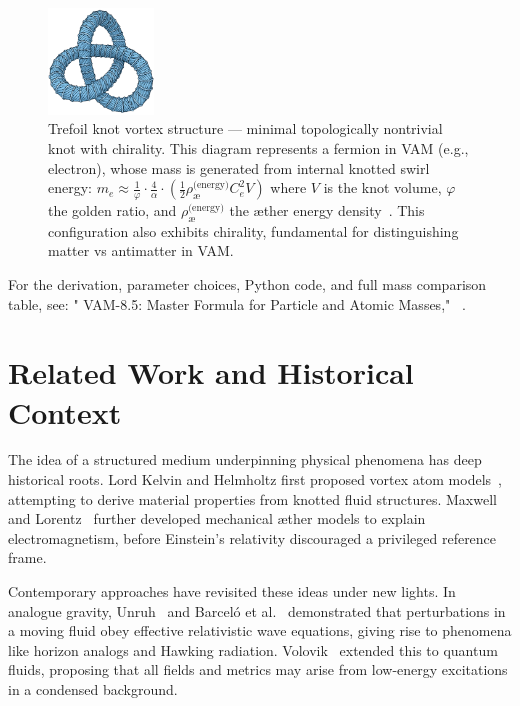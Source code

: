 \begin{figure}[H]
    \centering
    \includegraphics[width=0.25\textwidth]{figures/Tre-foil}
    \caption{Trefoil knot vortex structure — minimal topologically nontrivial knot with chirality. This diagram represents a fermion in VAM (e.g., electron), whose mass is generated from internal knotted swirl energy:
        \(
            m_e \approx \frac{1}{\varphi} \cdot \frac{4}{\alpha} \cdot \left( \frac{1}{2} \rho_{\text{\ae}}^{\text{(energy)}} C_e^2 V \right)
        \)
        where $V$ is the knot volume, $\varphi$ the golden ratio, and $\rho_{\text{\ae}}^{\text{(energy)}}$ the æther energy density~\cite{iskandarani2025a, iskandarani2025b}. This configuration also exhibits chirality, fundamental for distinguishing matter vs antimatter in VAM.}
    \label{fig:trefoil-vortex}
\end{figure}

For the derivation, parameter choices, Python code, and full mass comparison table, see: "  VAM-8.5: Master Formula for Particle and Atomic Masses," ~\cite{VAM-8, VAM-8.5}.

\section{Related Work and Historical Context}

    The idea of a structured medium underpinning physical phenomena has deep historical roots. Lord Kelvin and Helmholtz first proposed vortex atom models~\cite{thomson1867}, attempting to derive material properties from knotted fluid structures. Maxwell~\cite{maxwell1861} and Lorentz~\cite{lorentz1904} further developed mechanical æther models to explain electromagnetism, before Einstein's relativity discouraged a privileged reference frame.

    Contemporary approaches have revisited these ideas under new lights. In analogue gravity, Unruh~\cite{unruh1981} and Barceló et al.~\cite{barcelo2011} demonstrated that perturbations in a moving fluid obey effective relativistic wave equations, giving rise to phenomena like horizon analogs and Hawking radiation. Volovik~\cite{volovik2003} extended this to quantum fluids, proposing that all fields and metrics may arise from low-energy excitations in a condensed background.

